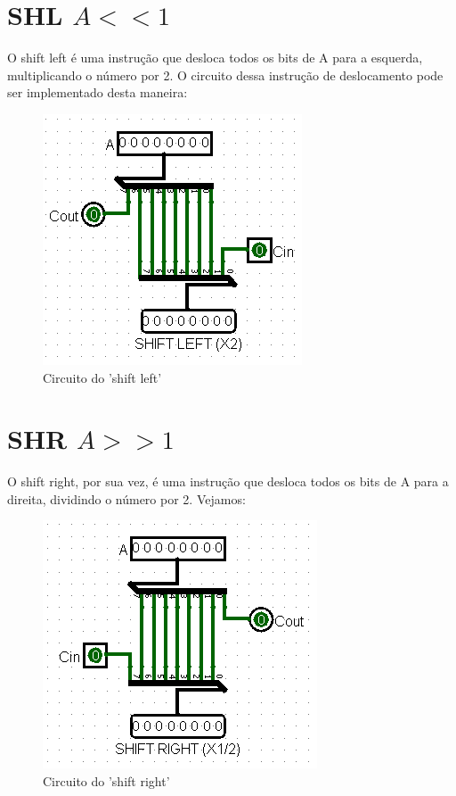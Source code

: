 \documentclass[
	12pt,				%
	openright,			%
	twoside,			%
	a4paper,			%
	english,			%
	french,				%
	spanish,			%
	brazil,				%
	]{abntex2}
\begin{document}
\section{SHL \texorpdfstring{$A << 1$}{Lg}}

O shift left é uma instrução que desloca todos os bits de A para a esquerda, multiplicando o número por 2. O circuito dessa instrução de deslocamento pode ser implementado desta maneira:

\begin{figure}[H]
	\begin{center}
	    \includegraphics[scale=0.6]{imagens/shiftleft.png}
	\end{center}
\caption{\label{shl}Circuito do 'shift left'}
\end{figure}


\section{SHR \texorpdfstring{$A >> 1$}{Lg}}

O shift right, por sua vez, é uma instrução que desloca todos os bits de A para a direita, dividindo o número por 2. Vejamos:

\begin{figure}[H]
	\begin{center}
	    \includegraphics[scale=0.6]{imagens/shiftright.png}
	\end{center}
\caption{\label{shr}Circuito do 'shift right'}
\end{figure}
\end{document}
